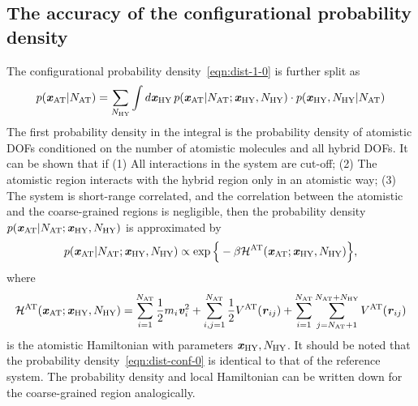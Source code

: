\documentclass[epjST]{svjour}
\newcommand{\vect}[1]{\textbf{\textit{#1}}}
\newcommand{\mh}[0]{\mathcal {H}}
\newcommand{\AT}[0]{\textrm{AT}}
\newcommand{\HY}[0]{\textrm{HY}}
\begin{document}
\subsection{The accuracy of the configurational probability density}
The configurational probability density~\eqref{eqn:dist-1-0} is further split as
\begin{align}\label{eqn:conf-split}
  p(\vect x_\AT \vert N_\AT) =
  \sum_{N_\HY} \int {d}\vect x_\HY\,
  p(\vect x_\AT \vert N_\AT; \vect x_\HY, N_\HY)\cdot
  p(\vect x_\HY, N_\HY\vert N_\AT)  
\end{align}
The first probability density in the integral is the probability density
of atomistic DOFs conditioned on the number of atomistic molecules and all
hybrid DOFs.
It can be shown that if
(1) All interactions in the system are cut-off;
(2) The atomistic region interacts with the hybrid region only in an atomistic way;
(3) The system is short-range correlated, and the correlation between the atomistic
and the coarse-grained regions is negligible, then the probability density $p(\vect x_\AT \vert N_\AT; \vect x_\HY, N_\HY)$
is approximated by
\begin{align}\label{eqn:dist-conf-0}
  p(\vect x_\AT \vert N_\AT; \vect x_\HY, N_\HY)
  \propto
  \exp\Big\{-\beta \mh^\AT(\vect x_\AT; \vect x_\HY, N_\HY) \Big\},
\end{align}
where 
\begin{align}
  \mh^\AT(\vect x_\AT; \vect x_\HY, N_\HY)
  =
  \sum_{i=1}^{N_\AT}\frac12 m_i\vect v_i^2 +
  \sum_{i,j=1}^{N_\AT} \frac12 V^\AT(\vect r_{ij}) +
  \sum_{i=1}^{N_\AT}\sum_{j=N_\AT+1}^{N_\AT + N_\HY} V^\AT(\vect r_{ij})
\end{align}
is the atomistic Hamiltonian with parameters $\vect x_\HY, N_\HY$. It
should be noted that the probability density~\eqref{eqn:dist-conf-0}
is identical to that of the reference system.
The probability density and local Hamiltonian
can be written down for the coarse-grained region analogically.
\end{document}
